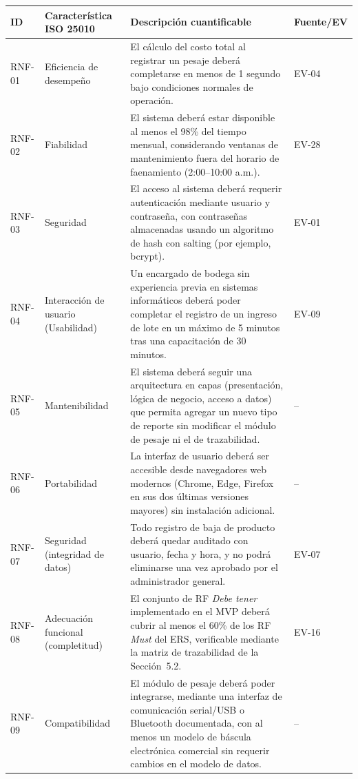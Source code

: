 \documentclass[11pt,a4paper]{article}
\begin{document}
\begin{longtable}{|p{1.2cm}|p{2.5cm}|p{8.3cm}|p{1.6cm}|}
\hline
\textbf{ID} & \textbf{Característica ISO 25010} & \textbf{Descripción cuantificable} & \textbf{Fuente/EV} \\
\hline
RNF-01 & Eficiencia de desempeño & El cálculo del costo total al registrar un pesaje deberá completarse en menos de 1 segundo bajo condiciones normales de operación. & EV-04 \\
\hline
RNF-02 & Fiabilidad & El sistema deberá estar disponible al menos el 98\% del tiempo mensual, considerando ventanas de mantenimiento fuera del horario de faenamiento (2:00--10:00 a.m.). & EV-28 \\
\hline
RNF-03 & Seguridad & El acceso al sistema deberá requerir autenticación mediante usuario y contraseña, con contraseñas almacenadas usando un algoritmo de hash con salting (por ejemplo, bcrypt). & EV-01 \\
\hline
RNF-04 & Interacción de usuario (Usabilidad) & Un encargado de bodega sin experiencia previa en sistemas informáticos deberá poder completar el registro de un ingreso de lote en un máximo de 5 minutos tras una capacitación de 30 minutos. & EV-09 \\
\hline
RNF-05 & Mantenibilidad & El sistema deberá seguir una arquitectura en capas (presentación, lógica de negocio, acceso a datos) que permita agregar un nuevo tipo de reporte sin modificar el módulo de pesaje ni el de trazabilidad. & -- \\
\hline
RNF-06 & Portabilidad & La interfaz de usuario deberá ser accesible desde navegadores web modernos (Chrome, Edge, Firefox en sus dos últimas versiones mayores) sin instalación adicional. & -- \\
\hline
RNF-07 & Seguridad (integridad de datos) & Todo registro de baja de producto deberá quedar auditado con usuario, fecha y hora, y no podrá eliminarse una vez aprobado por el administrador general. & EV-07 \\
\hline
RNF-08 & Adecuación funcional (completitud) & El conjunto de RF \textit{Debe tener} implementado en el MVP deberá cubrir al menos el 60\% de los RF \textit{Must} del ERS, verificable mediante la matriz de trazabilidad de la Sección~5.2. & EV-16 \\
\hline
RNF-09 & Compatibilidad & El módulo de pesaje deberá poder integrarse, mediante una interfaz de comunicación serial/USB o Bluetooth documentada, con al menos un modelo de báscula electrónica comercial sin requerir cambios en el modelo de datos. & -- \\

\end{longtable}
\end{document}
